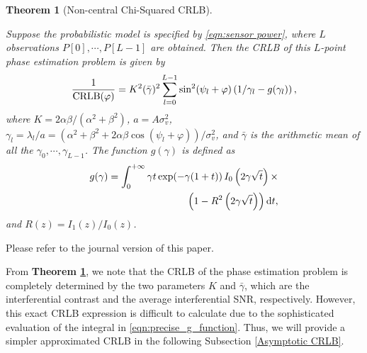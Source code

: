 \documentclass[conference,10pt,twocolumn]{IEEEtran}
\newtheorem{theorem}{\bf Theorem}
\theoremstyle{nonumberplain}
\begin{document}
    \begin{theorem}[Non-central Chi-Squared CRLB] \label{thm:precise CRLB}\mbox{}\par
        Suppose the probabilistic model is specified by \eqref{eqn:sensor power}, where $L$ observations $P[0],\cdots,P[L-1]$ are obtained. Then the CRLB of this $L$-point phase estimation problem is given by
        \begin{equation}
            \frac{1}{{\rm CRLB}(\varphi)} = K^2(\bar{\gamma})^2 \sum_{l=0}^{L-1}\sin^2(\psi_l+\varphi)\left(1/\gamma_l-g(\gamma_l)\right),
            \label{eqn:precise_CRLB}
        \end{equation}
        where $K=2\alpha\beta/(\alpha^2+\beta^2)$, $a=A\sigma_v^2$, $\gamma_l=\lambda_l/a=\left(\alpha^2+\beta^2+2\alpha\beta \cos(\psi_l+\varphi)\right)/\sigma_v^2$, and $\bar{\gamma}$ is the arithmetic mean of all the $\gamma_0,\cdots,\gamma_{L-1}$. The function $g(\gamma)$ is defined as 
        \begin{equation}
            \begin{aligned}
                g(\gamma)  = \int_{0}^{+\infty}\gamma t \, {\rm exp}(-\gamma(1+t))\, I_0\left(2\gamma\sqrt{t}\right) \times \\ 
                \left(1-R^2\left(2\gamma\sqrt{t}\right)\right){\rm d}t,
            \end{aligned}
            \label{eqn:precise_g_function}
        \end{equation}
        and $R(z)=I_1(z)/I_0(z)$. 
    \end{theorem}
    \begin{IEEEproof}
        Please refer to the journal version of this paper. 
    \end{IEEEproof}

    From \textbf{Theorem \ref{thm:precise CRLB}}, we note that the CRLB of the phase estimation problem is completely determined by the two parameters $K$ and $\bar{\gamma}$, which are the interferential contrast and the average interferential SNR, respectively. 
    However, this exact CRLB expression is difficult to calculate due to the sophisticated evaluation of the integral in \eqref{eqn:precise_g_function}.
    Thus, we will provide a simpler approximated CRLB in the following Subsection \ref{Asymptotic CRLB}.
    
\end{document}
